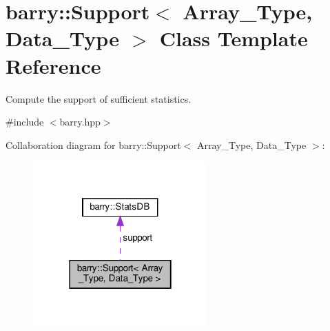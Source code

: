 \hypertarget{classbarry_1_1_support}{}\section{barry\+:\+:Support$<$ Array\+\_\+\+Type, Data\+\_\+\+Type $>$ Class Template Reference}
\label{classbarry_1_1_support}


Compute the support of sufficient statistics.  




{\ttfamily \#include $<$barry.\+hpp$>$}



Collaboration diagram for barry\+:\+:Support$<$ Array\+\_\+\+Type, Data\+\_\+\+Type $>$\+:
\nopagebreak
\begin{figure}[H]
\begin{center}
\leavevmode
\includegraphics[width=190pt]{classbarry_1_1_support__coll__graph}
\end{center}
\end{figure}

